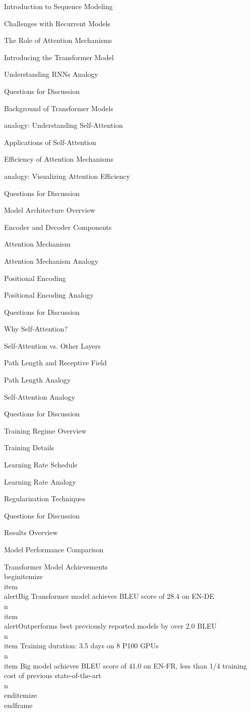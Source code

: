 \documentclass{beamer}
\begin{document}
\begin{frame}[]{Introduction to Sequence Modeling}
\begin{frame}[]{Challenges with Recurrent Models}
\begin{frame}[]{The Role of Attention Mechanisms}
\begin{frame}[]{Introducing the Transformer Model}
\begin{frame}[plain]{Understanding RNNs Analogy}
\begin{frame}[]{Questions for Discussion}
\begin{frame}[]{Background of Transformer Models}
\begin{frame}[plain]{analogy: Understanding Self-Attention}
\begin{frame}[]{Applications of Self-Attention}
\begin{frame}[]{Efficiency of Attention Mechanisms}
\begin{frame}[plain]{analogy: Visualizing Attention Efficiency}
\begin{frame}[]{Questions for Discussion}
\begin{frame}[]{Model Architecture Overview}
\begin{frame}[]{Encoder and Decoder Components}
\begin{frame}[]{Attention Mechanism}
\begin{frame}[plain]{Attention Mechanism Analogy}
\begin{frame}[]{Positional Encoding}
\begin{frame}[plain]{Positional Encoding Analogy}
\begin{frame}[]{Questions for Discussion}
\begin{frame}[]{Why Self-Attention?}
\begin{frame}[]{Self-Attention vs. Other Layers}
\begin{frame}[]{Path Length and Receptive Field}
\begin{frame}[plain]{Path Length Analogy}
\begin{frame}[plain]{Self-Attention Analogy}
\begin{frame}[]{Questions for Discussion}
\begin{frame}[]{Training Regime Overview}
\begin{frame}[]{Training Details}
\begin{frame}[]{Learning Rate Schedule}
\begin{frame}[plain]{Learning Rate Analogy}
\begin{frame}[]{Regularization Techniques}
\begin{frame}[]{Questions for Discussion}
\begin{frame}[]{Results Overview}
\begin{frame}[]{Model Performance Comparison}
\begingroup
{}\n{}\n\begin{frame}[]{Transformer Model Achievements}\n\\begin{itemize}
\\item \\alert{Big Transformer model achieves BLEU score of 28.4 on EN-DE}\\n\\item \\alert{Outperforms best previously reported models by over 2.0 BLEU}\\n\\item Training duration: 3.5 days on 8 P100 GPUs\\n\\item Big model achieves BLEU score of 41.0 on EN-FR, less than 1/4 training cost of previous state-of-the-art\\n\\end{itemize}
\\end{frame}

\endgroup


\end{frame}
\end{frame}
\end{frame}
\end{frame}
\end{frame}
\end{frame}
\end{frame}
\end{frame}
\end{frame}
\end{frame}
\end{frame}
\end{frame}
\end{frame}
\end{frame}
\end{frame}
\end{frame}
\end{frame}
\end{frame}
\end{frame}
\end{frame}
\end{frame}
\end{frame}
\end{frame}
\end{frame}
\end{frame}
\end{frame}
\end{frame}
\end{frame}
\end{frame}
\end{frame}
\end{frame}
\end{frame}
\end{frame}
\end{frame}
\end{document}
